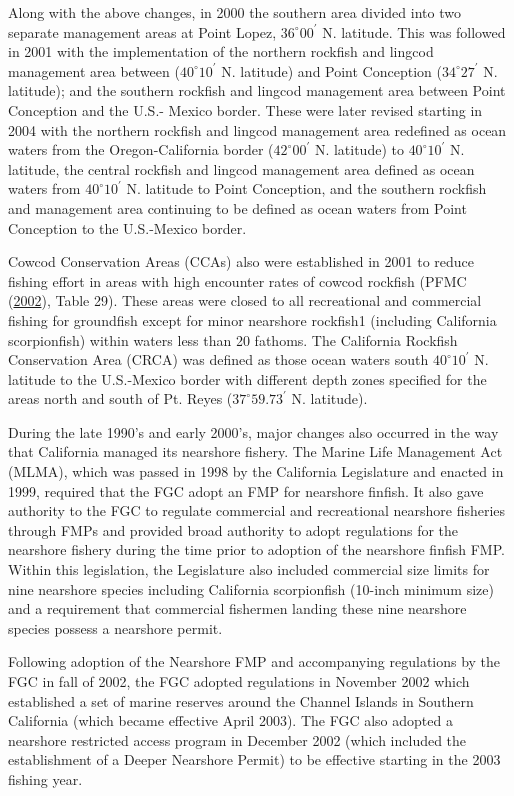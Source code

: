 \documentclass[12pt,]{article}
\begin{document}
Along with the above changes, in 2000 the southern area divided into two
separate management areas at Point Lopez, \(36^\circ 00^\prime\) N.
latitude. This was followed in 2001 with the implementation of the
northern rockfish and lingcod management area between
(\(40^\circ 10^\prime\) N. latitude) and Point Conception
(\(34^\circ 27^\prime\) N. latitude); and the southern rockfish and
lingcod management area between Point Conception and the U.S.- Mexico
border. These were later revised starting in 2004 with the northern
rockfish and lingcod management area redefined as ocean waters from the
Oregon-California border (\(42^\circ 00^\prime\) N. latitude) to
\(40^\circ 10^\prime\) N. latitude, the central rockfish and lingcod
management area defined as ocean waters from \(40^\circ 10^\prime\) N.
latitude to Point Conception, and the southern rockfish and management
area continuing to be defined as ocean waters from Point Conception to
the U.S.-Mexico border.

Cowcod Conservation Areas (CCAs) also were established in 2001 to reduce
fishing effort in areas with high encounter rates of cowcod rockfish
(PFMC (\protect\hyperlink{ref-PFMC2002}{2002}), Table 29). These areas
were closed to all recreational and commercial fishing for groundfish
except for minor nearshore rockfish1 (including California scorpionfish)
within waters less than 20 fathoms. The California Rockfish Conservation
Area (CRCA) was defined as those ocean waters south
\(40^\circ 10^\prime\) N. latitude to the U.S.-Mexico border with
different depth zones specified for the areas north and south of Pt.
Reyes (\(37^\circ 59.73^\prime\) N. latitude).

During the late 1990's and early 2000's, major changes also occurred in
the way that California managed its nearshore fishery. The Marine Life
Management Act (MLMA), which was passed in 1998 by the California
Legislature and enacted in 1999, required that the FGC adopt an FMP for
nearshore finfish. It also gave authority to the FGC to regulate
commercial and recreational nearshore fisheries through FMPs and
provided broad authority to adopt regulations for the nearshore fishery
during the time prior to adoption of the nearshore finfish FMP. Within
this legislation, the Legislature also included commercial size limits
for nine nearshore species including California scorpionfish (10-inch
minimum size) and a requirement that commercial fishermen landing these
nine nearshore species possess a nearshore permit.

Following adoption of the Nearshore FMP and accompanying regulations by
the FGC in fall of 2002, the FGC adopted regulations in November 2002
which established a set of marine reserves around the Channel Islands in
Southern California (which became effective April 2003). The FGC also
adopted a nearshore restricted access program in December 2002 (which
included the establishment of a Deeper Nearshore Permit) to be effective
starting in the 2003 fishing year.
\end{document}
